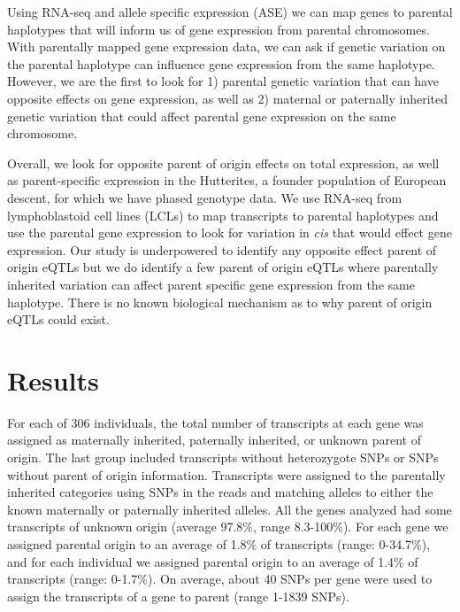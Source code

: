 Using RNA-seq and allele specific expression (ASE) we can map genes to parental haplotypes that will inform us of gene expression from parental chromosomes. With parentally mapped gene expression data, we can ask if genetic variation on the parental haplotype can influence gene expression from the same haplotype.  However, we are the first to look for 1) parental genetic variation that can have opposite effects on gene expression, as well as 2) maternal or paternally inherited genetic variation that could affect parental gene expression on the same chromosome. 	

Overall, we look for opposite parent of origin effects on total expression, as well as parent-specific expression in the Hutterites, a founder population of European descent, for which we have phased genotype data\cite{Livne2015}. We use RNA-seq from lymphoblastoid cell lines (LCLs) to map transcripts to parental haplotypes and use the parental gene expression to look for variation in \emph{cis} that would effect gene expression. Our study is underpowered to identify any opposite effect parent of origin eQTLs but we do identify a few parent of origin eQTLs where parentally inherited variation can affect parent specific gene expression from the same haplotype. There is no known biological mechanism as to why parent of origin eQTLs could exist. 

\section{Results}\label{ch04-results}

For each of 306 individuals, the total number of transcripts at each gene was assigned as maternally inherited, paternally inherited, or unknown parent of origin. The last group included transcripts without heterozygote SNPs or SNPs without parent of origin information. Transcripts were assigned to the parentally inherited categories using SNPs in the reads and matching alleles to either the known maternally or paternally inherited alleles. All the genes analyzed had some transcripts of unknown origin (average 97.8\%, range 8.3-100\%). For each gene we assigned parental origin to an average of 1.8\% of transcripts (range: 0-34.7\%), and for each individual we assigned parental origin to an average of 1.4\% of transcripts (range: 0-1.7\%). On average, about 40 SNPs per gene were used to assign the transcripts of a gene to parent (range 1-1839 SNPs). 


